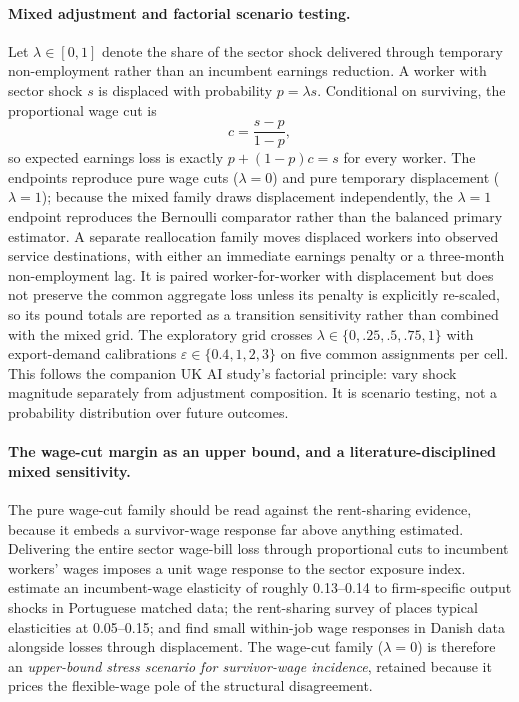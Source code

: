 \paragraph{Mixed adjustment and factorial scenario testing.} Let $\lambda\in[0,1]$ denote the share of the sector shock delivered through temporary non-employment rather than an incumbent earnings reduction. A worker with sector shock $s$ is displaced with probability $p=\lambda s$. Conditional on surviving, the proportional wage cut is
\[
c=\frac{s-p}{1-p},
\]
so expected earnings loss is exactly $p+(1-p)c=s$ for every worker. The endpoints reproduce pure wage cuts ($\lambda=0$) and pure temporary displacement ($\lambda=1$); because the mixed family draws displacement independently, the $\lambda=1$ endpoint reproduces the Bernoulli comparator rather than the balanced primary estimator. A separate reallocation family moves displaced workers into observed service destinations, with either an immediate earnings penalty or a three-month non-employment lag. It is paired worker-for-worker with displacement but does not preserve the common aggregate loss unless its penalty is explicitly re-scaled, so its pound totals are reported as a transition sensitivity rather than combined with the mixed grid. The exploratory grid crosses $\lambda\in\{0,.25,.5,.75,1\}$ with export-demand calibrations $\varepsilon\in\{0.4,1,2,3\}$ on five common assignments per cell. This follows the companion UK AI study's factorial principle: vary shock magnitude separately from adjustment composition. It is scenario testing, not a probability distribution over future outcomes.

\paragraph{The wage-cut margin as an upper bound, and a literature-disciplined mixed sensitivity.} The pure wage-cut family should be read against the rent-sharing evidence, because it embeds a survivor-wage response far above anything estimated. Delivering the entire sector wage-bill loss through proportional cuts to incumbent workers' wages imposes a unit wage response to the sector exposure index. \citet{garinsilverio2024} estimate an incumbent-wage elasticity of roughly 0.13--0.14 to firm-specific output shocks in Portuguese matched data; the rent-sharing survey of \citet{cardcardosoheining2018} places typical elasticities at 0.05--0.15; and \citet{hummels2014} find small within-job wage responses in Danish data alongside losses through displacement. The wage-cut family ($\lambda=0$) is therefore an \emph{upper-bound stress scenario for survivor-wage incidence}, retained because it prices the flexible-wage pole of the structural disagreement.


